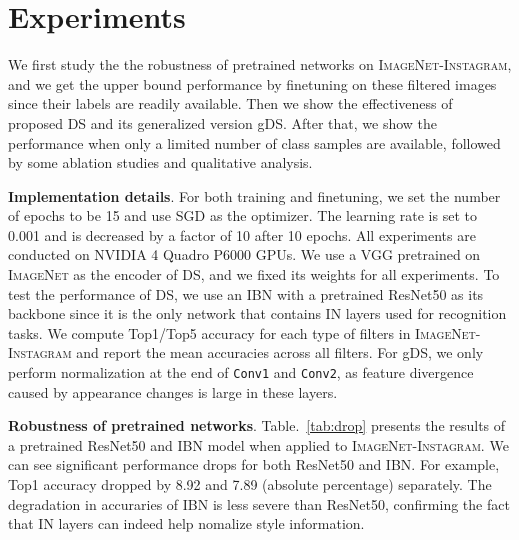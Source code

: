 \documentclass[letterpaper]{article} %
\newcommand{\instagram}{{\scshape ImageNet-Instagram}\xspace}
\newcommand{\imagenet}{{\scshape ImageNet}\xspace}
\newcommand{\system}{DS\xspace}
\newcommand{\gsystem}{gDS\xspace}
\begin{document}


\section{Experiments}
We first study the the robustness of pretrained networks on \instagram, and we get the upper bound performance by finetuning on these filtered images since their labels are readily available. Then we show the effectiveness of proposed \system and its generalized version \gsystem. After that, we show the performance when only a limited number of class samples are available, followed by some ablation studies and qualitative analysis.

\textbf{Implementation details}.
For both training and finetuning, we set the number of epochs to be 15 and use SGD as the optimizer. The learning rate is set to 0.001 and is decreased by a factor of 10 after 10 epochs. All experiments are conducted on NVIDIA 4 Quadro P6000 GPUs. We use a VGG pretrained on \imagenet as the encoder of \system, and we fixed its weights for all experiments. To test the performance of \system, we use an IBN with a pretrained ResNet50 as its backbone since it is the only network that contains IN layers used for recognition tasks. We compute Top1/Top5 accuracy for each type of filters in \instagram and report the mean accuracies across all filters. For \gsystem, we only perform normalization at the end of \texttt{Conv1} and \texttt{Conv2}, as feature divergence caused by appearance changes is large in these layers.


\textbf{Robustness of pretrained networks}. Table.~\ref{tab:drop} presents the results of a pretrained ResNet50 and IBN model when applied to \instagram. We can see significant performance drops for both ResNet50 and IBN. For example, Top1 accuracy dropped by 8.92 and 7.89 (absolute percentage) separately.  The degradation in accuraries of IBN is less severe than ResNet50, confirming the fact that IN layers can indeed help nomalize style information.
\end{document}
